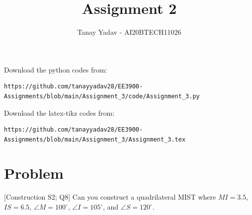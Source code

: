 \documentclass[journal,12pt,twocolumn]{IEEEtran}
\begin{document}
\let\vec\mathbf
\renewcommand{\thefigure}{\theproblem}
\def\putbox#1#2#3{\makebox[0in][l]{\makebox[#1][l]{}\raisebox{\baselineskip}[0in][0in]{\raisebox{#2}[0in][0in]{#3}}}}
     \def\rightbox#1{\makebox[0in][r]{#1}}
     \def\centbox#1{\makebox[0in]{#1}}
     \def\topbox#1{\raisebox{-\baselineskip}[0in][0in]{#1}}
     \def\midbox#1{\raisebox{-0.5\baselineskip}[0in][0in]{#1}}
\vspace{3cm}
\title{Assignment 2}
\author{Tanay Yadav - AI20BTECH11026}
\maketitle
\newpage
\bigskip
\renewcommand{\thefigure}{\theenumi}
\renewcommand{\thetable}{\theenumi}
Download the python codes from: 
%
\begin{lstlisting}
https://github.com/tanayyadav28/EE3900-Assignments/blob/main/Assignment_3/code/Assignment_3.py
\end{lstlisting}
Download the latex-tikz codes from: 
%
\begin{lstlisting}
https://github.com/tanayyadav28/EE3900-Assignments/blob/main/Assignment_3/Assignment_3.tex
\end{lstlisting}
\section{Problem}
[Construction S2; Q8]
Can you construct a quadrilateral MIST where $MI = 3.5$, $IS = 6.5$, $\angle M = 100^{\circ}$, $\angle I = 105^{\circ}$, and $\angle S = 120^{\circ}$.
\end{document}
